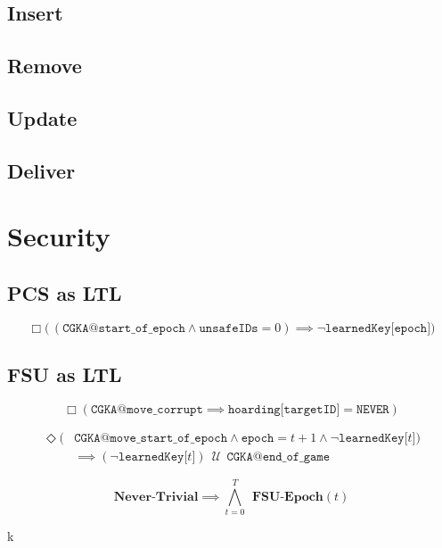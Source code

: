 \hypertarget{insert}{%
\subsection{Insert}\label{insert}}


\hypertarget{remove}{%
\subsection{Remove}\label{remove}}


\hypertarget{update}{%
\subsection{Update}\label{update}}


\hypertarget{deliver}{%
\subsection{Deliver}\label{deliver}}


\hypertarget{sec:LTL-security}{%
\section{Security}\label{sec:LTL-security}}


\hypertarget{pcs-as-ltl}{%
\subsection{PCS as LTL}\label{pcs-as-ltl}}

\begin{LTL}[\,PCS\,]
    $$
    \Box \Big(\, ( \texttt{CGKA@start\_of\_epoch} \land \texttt{unsafeIDs} = 0 ) \implies \neg \texttt{learnedKey[epoch]} \Big)
    $$
\end{LTL}


\hypertarget{fsu-as-ltl}{%
\subsection{FSU as LTL}\label{fsu-as-ltl}}

\begin{LTL}
    $$
    \Box \left( \texttt{CGKA@move\_corrupt} \implies \texttt{hoarding[targetID]} = \texttt{NEVER} \right)
    $$
\end{LTL}

\begin{LTL}
    \begin{equation*}
    \begin{split}
    \Diamond ( & \texttt{CGKA@move\_start\_of\_epoch} \land \texttt{epoch} = t + 1 \land \neg \texttt{learnedKey[$t$]} ) \\
    & \implies ( \neg \texttt{learnedKey[$t$]} ) \,\;{\mathcal {U}}\;\, \texttt{CGKA@end\_of\_game}
    \end{split}
    \end{equation*}
\end{LTL}

\begin{LTL}[\;FSU\;]
    $$
    \textbf{Never-Trivial} \implies \bigwedge\limits_{t=0}^{T} \;\,\textbf{FSU-Epoch}(t)
    $$
\end{LTL}
k
